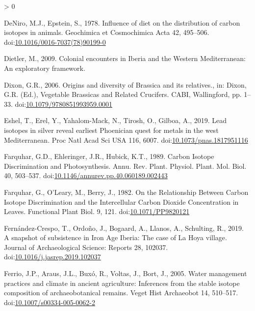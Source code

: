 \documentclass[5p]{elsarticle} %
\newlength{\cslhangindent}
\newenvironment{CSLReferences}[2] %
 {%
  \setlength{\parindent}{0pt}
  \ifodd #1 \everypar{\setlength{\hangindent}{\cslhangindent}}\ignorespaces\fi
  \ifnum #2 > 0
  \setlength{\parskip}{#2\baselineskip}
  \fi
 }%
 {}
\begin{document}
\begin{CSLReferences}{1}{0}
\leavevmode\hypertarget{ref-deniro_epstein78}{}%
DeNiro, M.J., Epstein, S., 1978. Influence of diet on the distribution of carbon isotopes in animals. Geochimica et Cosmochimica Acta 42, 495--506. doi:\href{https://doi.org/10.1016/0016-7037(78)90199-0}{10.1016/0016-7037(78)90199-0}

\leavevmode\hypertarget{ref-dietler09}{}%
Dietler, M., 2009. Colonial encounters in {Iberia} and the {Western Mediterranean}: {An} exploratory framework.

\leavevmode\hypertarget{ref-dixon06}{}%
Dixon, G.R., 2006. Origins and diversity of {Brassica} and its relatives., in: Dixon, G.R. (Ed.), Vegetable Brassicas and Related Crucifers. {CABI}, {Wallingford}, pp. 1--33. doi:\href{https://doi.org/10.1079/9780851993959.0001}{10.1079/9780851993959.0001}

\leavevmode\hypertarget{ref-eshel_etal19}{}%
Eshel, T., Erel, Y., Yahalom-Mack, N., Tirosh, O., Gilboa, A., 2019. Lead isotopes in silver reveal earliest {Phoenician} quest for metals in the west {Mediterranean}. Proc Natl Acad Sci USA 116, 6007. doi:\href{https://doi.org/10.1073/pnas.1817951116}{10.1073/pnas.1817951116}

\leavevmode\hypertarget{ref-farquhar_etal89}{}%
Farquhar, G.D., Ehleringer, J.R., Hubick, K.T., 1989. Carbon {Isotope Discrimination} and {Photosynthesis}. Annu. Rev. Plant. Physiol. Plant. Mol. Biol. 40, 503--537. doi:\href{https://doi.org/10.1146/annurev.pp.40.060189.002443}{10.1146/annurev.pp.40.060189.002443}

\leavevmode\hypertarget{ref-farquhar_etal82}{}%
Farquhar, G., O'Leary, M., Berry, J., 1982. On the {Relationship Between Carbon Isotope Discrimination} and the {Intercellular Carbon Dioxide Concentration} in {Leaves}. Functional Plant Biol. 9, 121. doi:\href{https://doi.org/10.1071/PP9820121}{10.1071/PP9820121}

\leavevmode\hypertarget{ref-fernandez-crespo_etal19}{}%
Fernández-Crespo, T., Ordoño, J., Bogaard, A., Llanos, A., Schulting, R., 2019. A snapshot of subsistence in {Iron Age Iberia}: {The} case of {La Hoya} village. Journal of Archaeological Science: Reports 28, 102037. doi:\href{https://doi.org/10.1016/j.jasrep.2019.102037}{10.1016/j.jasrep.2019.102037}

\leavevmode\hypertarget{ref-ferrio_etal05}{}%
Ferrio, J.P., Araus, J.L., Buxó, R., Voltas, J., Bort, J., 2005. Water management practices and climate in ancient agriculture: Inferences from the stable isotope composition of archaeobotanical remains. Veget Hist Archaeobot 14, 510--517. doi:\href{https://doi.org/10.1007/s00334-005-0062-2}{10.1007/s00334-005-0062-2}


\end{CSLReferences}
\end{document}
